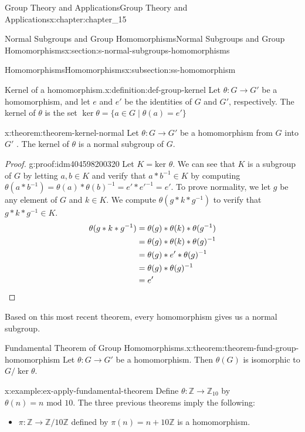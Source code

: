 \documentclass[twoside,10pt,]{book}
\newcommand{\qedhere}{\relax}
\numberwithin{equation}{section}
\begin{document}
\begin{chapterptx}{Group Theory and Applications}{}{Group Theory and Applications}{}{}{x:chapter:chapter_15}
\begin{sectionptx}{Normal Subgroups and Group Homomorphisms}{}{Normal Subgroups and Group Homomorphisms}{}{}{x:section:s-normal-subgroups-homomorphisms}
\begin{subsectionptx}{Homomorphisms}{}{Homomorphisms}{}{}{x:subsection:ss-homomorphism}
\begin{definition}{Kernel of a homomorphism.}{x:definition:def-group-kernel}%
%
\label{g:notation:idm404598206048}%
Let  \(\theta: G \to  G'\) be a homomorphism, and let \(e\) and \(e'\) be the identities of \(G\) and \(G'\), respectively. The kernel of \(\theta\) is the set \(\ker \theta=\{a\in G \mid \theta(a)=e'\}\)%
\end{definition}
\begin{theorem}{}{}{x:theorem:theorem-kernel-normal}%
Let \(\theta: G \to  G'\) be a homomorphism from  \(G\)  into  \(G'\) . The kernel of \(\theta\) is a normal subgroup of \(G\).%
\end{theorem}
\begin{proof}{}{g:proof:idm404598200320}
Let \(K=\textrm{ker }\theta\). We can see that \(K\) is a subgroup of \(G\) by letting \(a,b \in K\) and verify that \(a*b^{-1} \in K\) by computing \(\theta(a*b^{-1})= \theta(a)*\theta(b)^{-1} = e'*e'^{-1}=e'\).  To prove normality, we let \(g\) be any element of \(G\) and \(k \in K\).  We compute \(\theta(g*k*g^{-1})\) to verify that \(g*k*g^{-1}\in K\).%
\begin{equation*}
\begin{split}
\theta(g*k*g^{-1}) &=\theta(g)*\theta(k)*\theta(g^{-1})\\
& =\theta(g)*\theta(k)*\theta(g)^{-1}\\
& =\theta(g)*e'*\theta(g)^{-1}\\
& =\theta(g)* \theta(g)^{-1}\\
& =e'\\
\end{split}\qedhere
\end{equation*}
%
\end{proof}
Based on this most recent theorem, every homomorphism gives us a normal subgroup.%
\begin{theorem}{Fundamental Theorem of Group Homomorphisms.}{}{x:theorem:theorem-fund-group-homomorphism}%
%
Let \(\theta: G \to  G'\) be a homomorphism.  Then \(\theta(G)\) is isomorphic to \(G/\ker \theta\).%
\end{theorem}
\begin{example}{}{x:example:ex-apply-fundamental-theorem}%
Define  \(\theta: \mathbb{Z} \rightarrow  \mathbb{Z}_{10}\) by \(\theta(n) = n \textrm{ mod }10\). The three previous theorems imply the following:%
\begin{itemize}[label=\textbullet]
\item{}\(\pi: \mathbb{Z} \rightarrow  \mathbb{Z}/10\mathbb{Z}\) defined by \(\pi(n) = n + 10\mathbb{Z}\) is a homomorphism.%

\end{itemize}
\end{example}
\end{subsectionptx}
\end{sectionptx}
\end{chapterptx}
\end{document}
